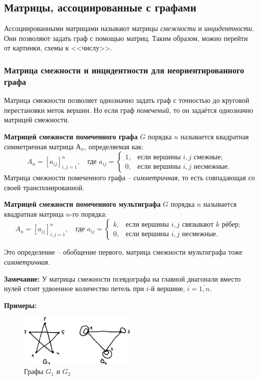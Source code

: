 \documentclass[12pt, a4paper]{article}
\begin{document}
\subsection{Матрицы, ассоциированные с графами}

Ассоциированными матрицами называют матрицы \textit{смежности} и \textit{инцидентности}. Они позволяют задать граф с помощью матриц. Таким образом, можно перейти от картинки, схемы к <<числу>>.

\subsubsection{Матрица смежности и инцидентности для неориентированного графа}

Матрица смежности позволяет однозначно задать граф с точностью до круговой перестановки меток вершин. Но если граф \textit{помеченый}, то он задаётся однозначно матрицей смежности.

\textbf{Матрицей смежности помеченного графа} $G$ порядка $n$ называется квадратная симметричная матрица $А_n$, определяемая как:
\[A_n = \left[ a_{ij} \right]_{i,j=1}^n, \quad \textrm{где } a_{ij} = \begin{cases} 1, & \textrm{если вершины } i,j \textrm{ смежные}; \\ 0, & \textrm{если вершины } i,j \textrm{ несмежные}. \end{cases} \]
Матрица смежности помеченного графа -- \textit{симметричная}, то есть совпадающая со своей транспонированной.

\textbf{Матрицей смежности помеченного мультиграфа} $G$ порядка $n$ называется квадратная матрица $n$-го порядка:
\[A_n = \left[ a_{ij} \right]_{i,j=1}^n, \quad \textrm{где } a_{ij} = \begin{cases} k, & \textrm{если вершины } i,j \textrm{ связывают } k \textrm{ рёбер}; \\ 0, & \textrm{если вершины } i,j \textrm{ несмежные}. \end{cases} \]

Это определение -- обобщение первого, матрица смежности мультиграфа тоже \textit{симметричная}.

\textbf{Замечание:} У матрицы смежности псевдографа на главной диагонали вместо нулей стоит удвоенное количество петель при $i$-й вершине, $i=\bar{1,n}$.

\textbf{Примеры:}

\begin{figure}[h]
 \centering
 \includegraphics[width=0.5\textwidth]{44}
 \vspace{-3mm}
 \caption{Графы $G_1$ и $G_2$}
\end{figure}
\end{document}
